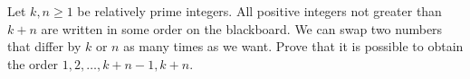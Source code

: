Let $k,n\ge 1$ be relatively prime integers. All positive integers not greater than $k+n$ are written in some order on the blackboard. We can swap two numbers that differ by $k$ or $n$ as many times as we want. Prove that it is possible to obtain the order $1,2,\dots,k+n-1, k+n$.